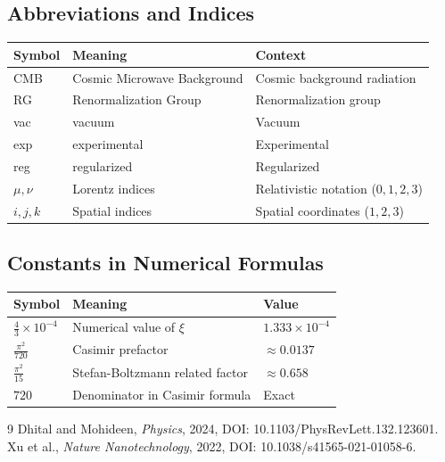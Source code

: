 	\subsection{Abbreviations and Indices}
	\begin{longtable}{>{\raggedright\arraybackslash}p{1.5cm} >{\raggedright\arraybackslash}p{6.5cm} >{\raggedright\arraybackslash}p{2.5cm}}
		\toprule
		\textbf{Symbol} & \textbf{Meaning} & \textbf{Context} \\
		\midrule
		CMB & Cosmic Microwave Background & Cosmic background radiation \\
		RG & Renormalization Group & Renormalization group \\
		vac & vacuum & Vacuum \\
		exp & experimental & Experimental \\
		reg & regularized & Regularized \\
		$\mu, \nu$ & Lorentz indices & Relativistic notation ($0,1,2,3$) \\
		$i, j, k$ & Spatial indices & Spatial coordinates ($1,2,3$) \\
		\bottomrule
	\end{longtable}
	
	\subsection{Constants in Numerical Formulas}
	\begin{longtable}{>{\raggedright\arraybackslash}p{1.5cm} >{\raggedright\arraybackslash}p{6.5cm} >{\raggedright\arraybackslash}p{2.5cm}}
		\toprule
		\textbf{Symbol} & \textbf{Meaning} & \textbf{Value} \\
		\midrule
		$\frac{4}{3} \times 10^{-4}$ & Numerical value of $\xi$ & $1.333 \times 10^{-4}$ \\
		$\frac{\pi^2}{720}$ & Casimir prefactor & $\approx 0.0137$ \\
		$\frac{\pi^2}{15}$ & Stefan-Boltzmann related factor & $\approx 0.658$ \\
		$720$ & Denominator in Casimir formula & Exact \\
		\bottomrule
	\end{longtable}
	
	
		\begin{thebibliography}{9}
		Dhital and Mohideen, \emph{Physics}, 2024, DOI: 10.1103/PhysRevLett.132.123601.
		Xu et al., \emph{Nature Nanotechnology}, 2022, DOI: 10.1038/s41565-021-01058-6.
	\end{thebibliography}
